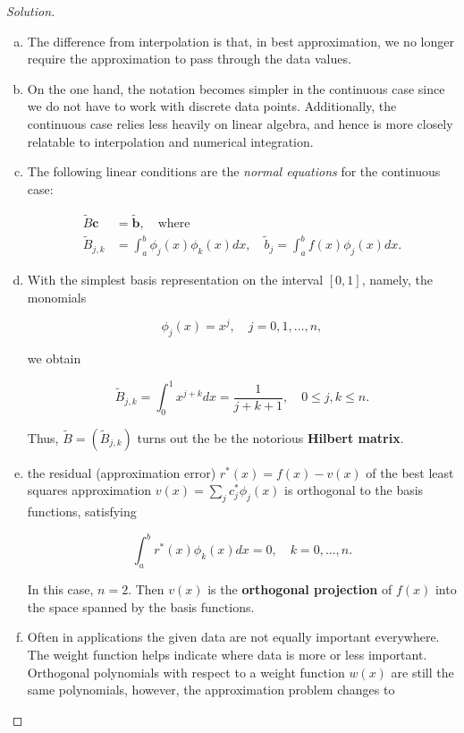 \documentclass[12pt,a4]{article}
\theoremstyle{definition}
\begin{document}
\begin{proof}[Solution]
	\begin{enumerate}[(a)]
		\item The difference from interpolation is that, in best approximation, we no longer require the approximation to pass through the data values. 
		
		\item On the one hand, the notation becomes simpler in the continuous case since we do not have to work with discrete data points. Additionally, the continuous case relies less heavily on linear algebra, and hence is more closely relatable to interpolation and numerical integration.
		
		\item The following linear conditions are the \emph{normal equations} for the continuous case:
		
		\begin{align*}
		\tilde{B} \mathbf{c} &= \tilde{\mathbf{b}} {,} \quad \text{where} \\
		\tilde{B}_{j, k} &= \int_a^b \phi_j(x) \phi_k(x) dx {,} \quad \tilde{b}_j = \int_a^b f(x) \phi_j(x) dx {.}
		\end{align*}
		
		\item With the simplest basis representation on the interval $[0, 1]$, namely, the monomials
		
		\[
		\phi_j(x) = x^j {,} \quad j = 0, 1, \ldots, n {,} 
		\]
		
		\noindent we obtain
		
		\[
		\tilde{B}_{j, k} = \int_0^1 x^{j + k} dx = \frac{1}{j + k + 1} {,} \quad 0 \leq j, k \leq n {.}
		\]
		
		\noindent Thus, $\tilde{B} = \left( \tilde{B}_{j, k} \right)$ turns out the be the notorious \textbf{Hilbert matrix}. 
		
		\item the residual (approximation error) $r^*(x) = f(x) - v(x)$ of the best least squares approximation $v(x) = \sum_j c_j^* \phi_j(x)$ is orthogonal to the basis functions, satisfying
		
		\[
		\int_a^b r^*(x) \phi_k(x) dx = 0 {,} \quad k = 0, \ldots, n {.}
		\]
		
		\noindent In this case, $n = 2$. Then $v(x)$ is the \textbf{orthogonal projection} of $f(x)$ into the space spanned by the basis functions. 
		
		\item Often in applications the given data are not equally important everywhere. The weight function helps indicate where data is more or less important. Orthogonal polynomials with respect to a weight function $w(x)$ are still the same polynomials, however, the approximation problem changes to
		

\end{enumerate}
\end{proof}
\end{document}
